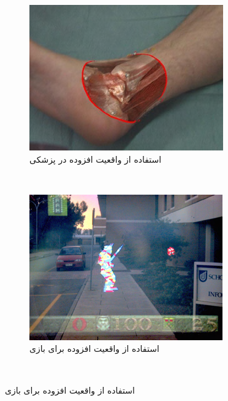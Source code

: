 	\begin{figure}
		\centering
		\begin{subfigure}[b]{0.4\textwidth}
			\includegraphics[width=\textwidth]{image/AR_in_medicine}
			\caption{استفاده از واقعیت افزوده در پزشکی
			\\
		\cite{nasir}}
			\label{fig:gull}
		\end{subfigure}
		~ %
		\begin{subfigure}[b]{0.4\textwidth}
			\includegraphics[width=\textwidth]{image/ARQuake_outdoor_AR_game}
			\caption{استفاده از واقعیت افزوده برای بازی
			\\
			\cite{Piekarski}}
			\label{fig:tiger}
		\end{subfigure}
		~ %
		

\end{figure}
